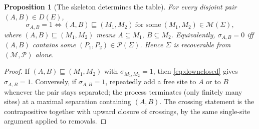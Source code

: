 \documentclass[10pt,a4paper]{amsart}
\newtheorem{proposition}{Proposition}
\newcommand{\Mset}{\mathcal{M}}
\newcommand{\Pset}{\mathcal{P}}
\newcommand{\dom}{D(E)}
\begin{document}
\begin{proposition}[The skeleton determines the table]
\label{prop:skeleton}
For every disjoint pair $(A,B)\in\dom$,
\[
  \sigma_{A,B}=1 \iff (A,B)\sqsubseteq (M_1,M_2)\ \text{for some}\ (M_1,M_2)\in\Mset(\Sigma),
\]
where $(A,B)\sqsubseteq(M_1,M_2)$ means $A\subseteq M_1,\ B\subseteq M_2$.
Equivalently, $\sigma_{A,B}=0$ iff $(A,B)$ contains some
$(P_1,P_2)\in\Pset(\Sigma)$. Hence $\Sigma$ is recoverable from
$(\Mset,\Pset)$ alone.
\end{proposition}

\begin{proof}
If $(A,B)\sqsubseteq(M_1,M_2)$ with $\sigma_{M_1,M_2}=1$, then
\eqref{eq:downclosed} gives $\sigma_{A,B}=1$. Conversely, if $\sigma_{A,B}=1$,
repeatedly add a free site to $A$ or to $B$ whenever the pair stays separated;
the process terminates (only finitely many sites) at a maximal separation
containing $(A,B)$. The crossing statement is the contrapositive together with
upward closure of crossings, by the same single-site argument applied to
removals.
\end{proof}
\end{document}
